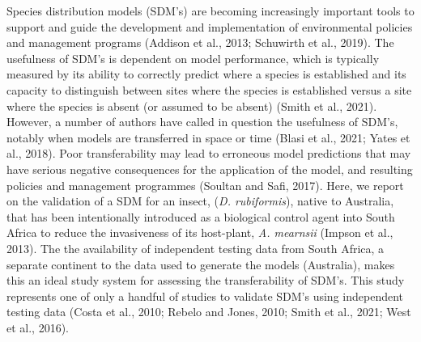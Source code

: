 \documentclass[12pt,]{article}
\begin{document}
Species distribution models (SDM's) are becoming increasingly important
tools to support and guide the development and implementation of
environmental policies and management programs (Addison et al., 2013;
Schuwirth et al., 2019). The usefulness of SDM's is dependent on model
performance, which is typically measured by its ability to correctly
predict where a species is established and its capacity to distinguish
between sites where the species is established versus a site where the
species is absent (or assumed to be absent) (Smith et al., 2021).
However, a number of authors have called in question the usefulness of
SDM's, notably when models are transferred in space or time (Blasi et
al., 2021; Yates et al., 2018). Poor transferability may lead to
erroneous model predictions that may have serious negative consequences
for the application of the model, and resulting policies and management
programmes (Soultan and Safi, 2017). Here, we report on the validation
of a SDM for an insect, (\emph{D. rubiformis}), native to Australia,
that has been intentionally introduced as a biological control agent
into South Africa to reduce the invasiveness of its host-plant, \emph{A.
mearnsii} (Impson et al., 2013). The the availability of independent
testing data from South Africa, a separate continent to the data used to
generate the models (Australia), makes this an ideal study system for
assessing the transferability of SDM's. This study represents one of
only a handful of studies to validate SDM's using independent testing
data (Costa et al., 2010; Rebelo and Jones, 2010; Smith et al., 2021;
West et al., 2016).
\end{document}
